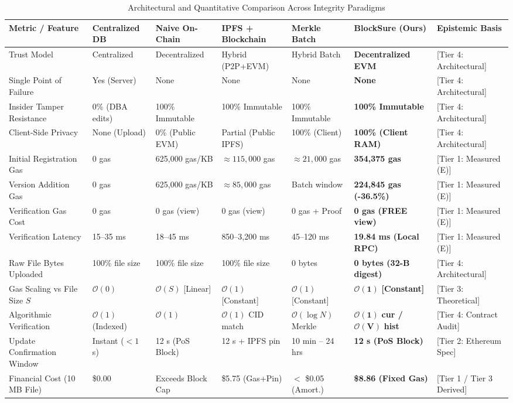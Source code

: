 \documentclass[10pt,conference,letterpaper]{IEEEtran}
\begin{document}
\begin{table}[t]
\centering
\caption{Architectural and Quantitative Comparison Across Integrity Paradigms}
\label{tab:comparative_benchmarks}
\footnotesize
\setlength{\tabcolsep}{3.5pt}
\begin{tabularx}{\textwidth}{p{2.6cm} Y Y Y Y Y p{2.4cm}}
\toprule
\textbf{Metric / Feature} & \textbf{Centralized DB} & \textbf{Naive On-Chain} & \textbf{IPFS + Blockchain} & \textbf{Merkle Batch} & \textbf{BlockSure (Ours)} & \textbf{Epistemic Basis} \\
\midrule
Trust Model & Centralized & Decentralized & Hybrid (P2P+EVM) & Hybrid Batch & \textbf{Decentralized EVM} & [Tier 4: Architectural] \\
Single Point of Failure & Yes (Server) & None & None & None & \textbf{None} & [Tier 4: Architectural] \\
Insider Tamper Resistance & 0\% (DBA edits) & 100\% Immutable & 100\% Immutable & 100\% Immutable & \textbf{100\% Immutable} & [Tier 4: Architectural] \\
Client-Side Privacy & None (Upload) & 0\% (Public EVM) & Partial (Public IPFS) & 100\% (Client) & \textbf{100\% (Client RAM)} & [Tier 4: Architectural] \\
Initial Registration Gas & 0 gas & 625,000 gas/KB & $\approx 115{,}000$ gas & $\approx 21{,}000$ gas & \textbf{354,375 gas} & [Tier 1: Measured (E)] \\
Version Addition Gas & 0 gas & 625,000 gas/KB & $\approx 85{,}000$ gas & Batch window & \textbf{224,845 gas (-36.5\%)} & [Tier 1: Measured (E)] \\
Verification Gas Cost & 0 gas & 0 gas (view) & 0 gas (view) & 0 gas + Proof & \textbf{0 gas (FREE view)} & [Tier 1: Measured (E)] \\
Verification Latency & 15--35 ms & 18--45 ms & 850--3,200 ms & 45--120 ms & \textbf{19.84 ms (Local RPC)} & [Tier 1: Measured (E)] \\
Raw File Bytes Uploaded & 100\% file size & 100\% file size & 100\% file size & 0 bytes & \textbf{0 bytes (32-B digest)} & [Tier 4: Architectural] \\
Gas Scaling vs File Size $S$ & $\mathcal{O}(0)$ & $\mathcal{O}(S)$ [Linear] & $\mathcal{O}(1)$ [Constant] & $\mathcal{O}(1)$ [Constant] & $\mathbf{\mathcal{O}(1)}$ \textbf{[Constant]} & [Tier 3: Theoretical] \\
Algorithmic Verification & $\mathcal{O}(1)$ (Indexed) & $\mathcal{O}(1)$ & $\mathcal{O}(1)$ CID match & $\mathcal{O}(\log N)$ Merkle & $\mathbf{\mathcal{O}(1)}$ \textbf{cur /} $\mathbf{\mathcal{O}(V)}$ \textbf{hist} & [Tier 4: Contract Audit] \\
Update Confirmation Window & Instant ($< 1$ s) & 12 s (PoS Block) & 12 s + IPFS pin & 10 min -- 24 hrs & \textbf{12 s (PoS Block)} & [Tier 2: Ethereum Spec] \\
Financial Cost (10 MB File) & \$0.00 & Exceeds Block Cap & \$5.75 (Gas+Pin) & $<$ \$0.05 (Amort.) & \textbf{\$8.86 (Fixed Gas)} & [Tier 1 / Tier 3 Derived] \\
\bottomrule
\end{tabularx}
\end{table}
\end{document}
